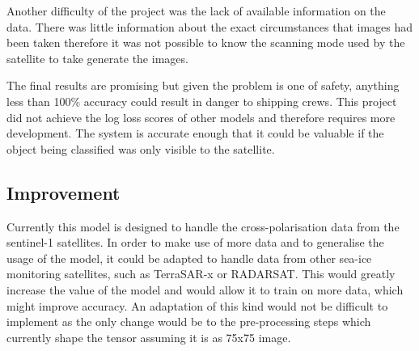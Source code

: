 \documentclass{article}
\begin{document}
Another difficulty of the project was the lack of available information on the data. There was little information about the exact circumstances that images had been taken therefore it was not possible to know the scanning mode used by the satellite to take generate the images. 

The final results are promising but given the problem is one of safety, anything less than 100\% accuracy could result in danger to shipping crews. This project did not achieve the log loss scores of other models and therefore requires more development. The system is accurate enough that it could be valuable if the object being classified was only visible to the satellite. 
\subsection{Improvement}
Currently this model is designed to handle the cross-polarisation data from the sentinel-1 satellites. In order to make use of more data and to generalise the usage of the model, it could be adapted to handle data from other sea-ice monitoring satellites, such as TerraSAR-x or RADARSAT. This would greatly increase the value of the model and would allow it to train on more data, which might improve accuracy. An adaptation of this kind would not be difficult to implement as the only change would be to the pre-processing steps which currently shape the tensor assuming it is as 75x75 image. 


{}
\end{document}
